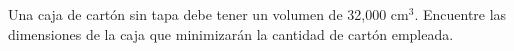 \item Una caja de cartón sin tapa debe tener un volumen de 32,000 $\text{cm}^3$. Encuentre las dimensiones de la caja que minimizarán la cantidad de cartón empleada.
